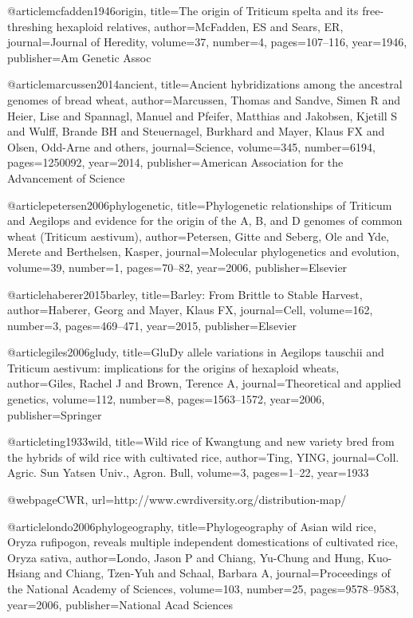 {@article{mcfadden1946origin,
  title={The origin of Triticum spelta and its free-threshing hexaploid relatives},
  author={McFadden, ES and Sears, ER},
  journal={Journal of Heredity},
  volume={37},
  number={4},
  pages={107--116},
  year={1946},
  publisher={Am Genetic Assoc}
}

@article{marcussen2014ancient,
  title={Ancient hybridizations among the ancestral genomes of bread wheat},
  author={Marcussen, Thomas and Sandve, Simen R and Heier, Lise and Spannagl, Manuel and Pfeifer, Matthias and Jakobsen, Kjetill S and Wulff, Brande BH and Steuernagel, Burkhard and Mayer, Klaus FX and Olsen, Odd-Arne and others},
  journal={Science},
  volume={345},
  number={6194},
  pages={1250092},
  year={2014},
  publisher={American Association for the Advancement of Science}
}

@article{petersen2006phylogenetic,
  title={Phylogenetic relationships of Triticum and Aegilops and evidence for the origin of the A, B, and D genomes of common wheat (Triticum aestivum)},
  author={Petersen, Gitte and Seberg, Ole and Yde, Merete and Berthelsen, Kasper},
  journal={Molecular phylogenetics and evolution},
  volume={39},
  number={1},
  pages={70--82},
  year={2006},
  publisher={Elsevier}
}

@article{haberer2015barley,
  title={Barley: From Brittle to Stable Harvest},
  author={Haberer, Georg and Mayer, Klaus FX},
  journal={Cell},
  volume={162},
  number={3},
  pages={469--471},
  year={2015},
  publisher={Elsevier}
}

@article{giles2006gludy,
  title={GluDy allele variations in Aegilops tauschii and Triticum aestivum: implications for the origins of hexaploid wheats},
  author={Giles, Rachel J and Brown, Terence A},
  journal={Theoretical and applied genetics},
  volume={112},
  number={8},
  pages={1563--1572},
  year={2006},
  publisher={Springer}
}

@article{ting1933wild,
  title={Wild rice of Kwangtung and new variety bred from the hybrids of wild rice with cultivated rice},
  author={Ting, YING},
  journal={Coll. Agric. Sun Yatsen Univ., Agron. Bull},
  volume={3},
  pages={1--22},
  year={1933}
}

@webpage{CWR,
    url={http://www.cwrdiversity.org/distribution-map/}
}

@article{londo2006phylogeography,
  title={Phylogeography of Asian wild rice, Oryza rufipogon, reveals multiple independent domestications of cultivated rice, Oryza sativa},
  author={Londo, Jason P and Chiang, Yu-Chung and Hung, Kuo-Hsiang and Chiang, Tzen-Yuh and Schaal, Barbara A},
  journal={Proceedings of the National Academy of Sciences},
  volume={103},
  number={25},
  pages={9578--9583},
  year={2006},
  publisher={National Acad Sciences}
}

}
